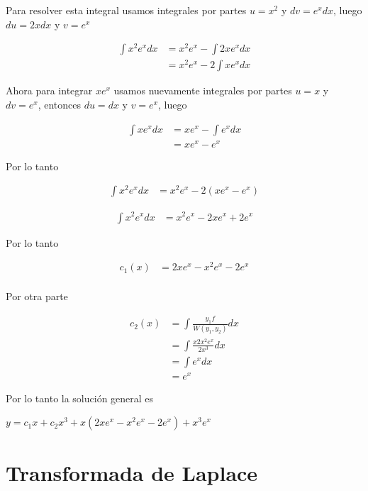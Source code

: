 \documentclass{article}
\theoremstyle{plain}
\theoremstyle{definition}
\begin{document}
Para resolver esta integral usamos integrales por partes $u=x^2$ y $dv=e^xdx$, luego $du=2xdx$ y $v=e^x$

\begin{align*}
\displaystyle  \int x^2e^x dx  &= x^2e^x -\int 2xe^x dx \\
&= x^2e^x -2\int xe^x dx
\end{align*}


Ahora para integrar $xe^x$ usamos nuevamente integrales por partes $u= x$ y $dv=e^x$, entonces $du=dx$ y $v=e^x$, luego


\begin{align*}
\displaystyle  \int xe^x dx  &= xe^x -\int e^x dx \\
&= xe^x -e^x
\end{align*}

Por lo tanto

\begin{align*}
\displaystyle  \int x^2e^x dx  &= x^2e^x -2(xe^x-e^x)
\end{align*}


\begin{align*}
\displaystyle  \int x^2e^x dx  &= x^2e^x -2xe^x+2e^x
\end{align*}


Por lo tanto

\begin{align*}
\displaystyle c_1(x) &= 2xe^x-x^2e^x -2e^x  \\
\end{align*}


Por otra parte


\begin{align*}
\displaystyle c_2(x) &= \int \frac{y_1 f}{W(y_1,y_2)} dx \\
&= \int \frac{x 2x^2e^x}{2x^3} dx \\
&= \int e^x dx \\
&= e^x
\end{align*}


Por lo tanto la solución general es

\begin{center}
$y= c_1 x+c_2x^3 + x(2xe^x-x^2e^x -2e^x)+ x^3e^x $
\end{center}

\newpage





\section{Transformada de Laplace}
\end{document}
